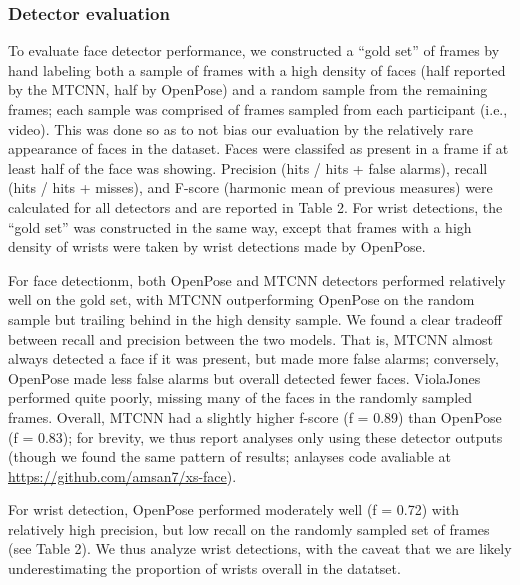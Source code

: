 \documentclass[10pt, letterpaper]{article}
\begin{document}
\subsubsection{Detector evaluation}\label{detector-evaluation}

To evaluate face detector performance, we constructed a ``gold set'' of
frames by hand labeling both a sample of frames with a high density of
faces (half reported by the MTCNN, half by OpenPose) and a random sample
from the remaining frames; each sample was comprised of frames sampled
from each participant (i.e., video). This was done so as to not bias our
evaluation by the relatively rare appearance of faces in the dataset.
Faces were classifed as present in a frame if at least half of the face
was showing. Precision (hits / hits + false alarms), recall (hits / hits
+ misses), and F-score (harmonic mean of previous measures) were
calculated for all detectors and are reported in Table 2. For wrist
detections, the ``gold set'' was constructed in the same way, except
that frames with a high density of wrists were taken by wrist detections
made by OpenPose.

For face detectionm, both OpenPose and MTCNN detectors performed
relatively well on the gold set, with MTCNN outperforming OpenPose on
the random sample but trailing behind in the high density sample. We
found a clear tradeoff between recall and precision between the two
models. That is, MTCNN almost always detected a face if it was present,
but made more false alarms; conversely, OpenPose made less false alarms
but overall detected fewer faces. ViolaJones performed quite poorly,
missing many of the faces in the randomly sampled frames. Overall, MTCNN
had a slightly higher f-score (f = 0.89) than OpenPose (f = 0.83); for
brevity, we thus report analyses only using these detector outputs
(though we found the same pattern of results; anlayses code avaliable at
\url{https://github.com/amsan7/xs-face}).

For wrist detection, OpenPose performed moderately well (f = 0.72) with
relatively high precision, but low recall on the randomly sampled set of
frames (see Table 2). We thus analyze wrist detections, with the caveat
that we are likely underestimating the proportion of wrists overall in
the datatset.
\end{document}
